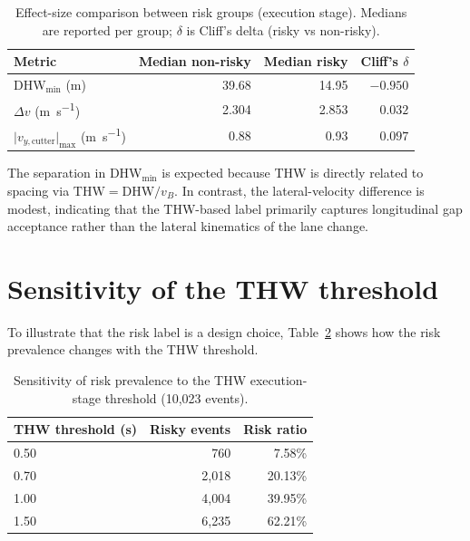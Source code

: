 \documentclass[12pt,a4paper,twoside,openright]{report}
\begin{document}
    \begin{table}[H]
        \centering
        \caption{Effect-size comparison between risk groups (execution stage). Medians are reported per group; $\delta$ is Cliff's delta (risky vs non-risky).}
        \label{tab:effect-sizes}
        \begin{tabular}{@{}lrrr@{}}
            \toprule
            Metric & Median non-risky & Median risky & Cliff's $\delta$ \\
            \midrule
            DHW$_{\min}$ (\si{\meter}) & 39.68 & 14.95 & $-0.950$ \\
            $\Delta v$ (\si{\meter\per\second}) & 2.304 & 2.853 & $0.032$ \\
            $\lvert v_{y,\text{cutter}}\rvert_{\max}$ (\si{\meter\per\second}) & 0.88 & 0.93 & $0.097$ \\
            \bottomrule
        \end{tabular}
    \end{table}

    The separation in DHW$_{\min}$ is expected because THW is directly related to spacing via $\mathrm{THW}=\mathrm{DHW}/v_B$. In contrast, the lateral-velocity difference is modest, indicating that the THW-based label primarily captures longitudinal gap acceptance rather than the lateral kinematics of the lane change.

    \section{Sensitivity of the THW threshold}
    To illustrate that the risk label is a design choice, Table~\ref{tab:sensitivity} shows how the risk prevalence changes with the THW threshold.

    \begin{table}[H]
        \centering
        \caption{Sensitivity of risk prevalence to the THW execution-stage threshold (10,023 events).}
        \label{tab:sensitivity}
        \begin{tabular}{@{}lrr@{}}
            \toprule
            THW threshold (s) & Risky events & Risk ratio \\
            \midrule
            0.50 & 760 & 7.58\% \\
            0.70 & 2,018 & 20.13\% \\
            1.00 & 4,004 & 39.95\% \\
            1.50 & 6,235 & 62.21\% \\
            \bottomrule
        \end{tabular}
    \end{table}
\end{document}
